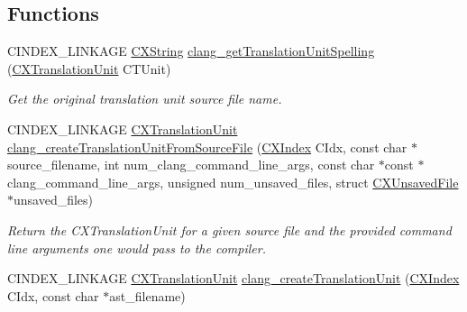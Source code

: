 \subsection*{Functions}
\begin{DoxyCompactItemize}
\item 
\mbox{\label{group__CINDEX__TRANSLATION__UNIT_ga7fb521c65f3aeb15b977d910098ceb0d}} 
C\+I\+N\+D\+E\+X\+\_\+\+L\+I\+N\+K\+A\+GE \mbox{\hyperlink{structCXString}{C\+X\+String}} \mbox{\hyperlink{group__CINDEX__TRANSLATION__UNIT_ga7fb521c65f3aeb15b977d910098ceb0d}{clang\+\_\+get\+Translation\+Unit\+Spelling}} (\mbox{\hyperlink{group__CINDEX_gacdb7815736ca709ce9a5e1ec2b7e16ac}{C\+X\+Translation\+Unit}} C\+T\+Unit)
\begin{DoxyCompactList}\small\item\em Get the original translation unit source file name. \end{DoxyCompactList}\item 
C\+I\+N\+D\+E\+X\+\_\+\+L\+I\+N\+K\+A\+GE \mbox{\hyperlink{group__CINDEX_gacdb7815736ca709ce9a5e1ec2b7e16ac}{C\+X\+Translation\+Unit}} \mbox{\hyperlink{group__CINDEX__TRANSLATION__UNIT_gaf45dfbcd2e4d8e9eeab4778f994a74c3}{clang\+\_\+create\+Translation\+Unit\+From\+Source\+File}} (\mbox{\hyperlink{group__CINDEX_gae039c2574bfd75774ca7a9a3e55910cb}{C\+X\+Index}} C\+Idx, const char $\ast$source\+\_\+filename, int num\+\_\+clang\+\_\+command\+\_\+line\+\_\+args, const char $\ast$const $\ast$clang\+\_\+command\+\_\+line\+\_\+args, unsigned num\+\_\+unsaved\+\_\+files, struct \mbox{\hyperlink{structCXUnsavedFile}{C\+X\+Unsaved\+File}} $\ast$unsaved\+\_\+files)
\begin{DoxyCompactList}\small\item\em Return the C\+X\+Translation\+Unit for a given source file and the provided command line arguments one would pass to the compiler. \end{DoxyCompactList}\item 
\mbox{\label{group__CINDEX__TRANSLATION__UNIT_ga0659baf7f04381286ec54b439760c8f3}} 
C\+I\+N\+D\+E\+X\+\_\+\+L\+I\+N\+K\+A\+GE \mbox{\hyperlink{group__CINDEX_gacdb7815736ca709ce9a5e1ec2b7e16ac}{C\+X\+Translation\+Unit}} \mbox{\hyperlink{group__CINDEX__TRANSLATION__UNIT_ga0659baf7f04381286ec54b439760c8f3}{clang\+\_\+create\+Translation\+Unit}} (\mbox{\hyperlink{group__CINDEX_gae039c2574bfd75774ca7a9a3e55910cb}{C\+X\+Index}} C\+Idx, const char $\ast$ast\+\_\+filename)

\end{DoxyCompactItemize}
